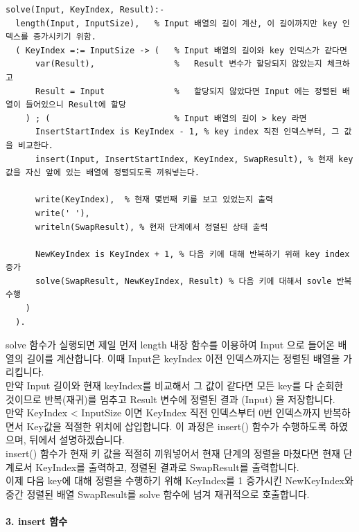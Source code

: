 \documentclass{article}
\begin{document}
\begin{verbatim}
solve(Input, KeyIndex, Result):-
  length(Input, InputSize),   % Input 배열의 길이 계산, 이 길이까지만 key 인덱스를 증가시키기 위함.
  ( KeyIndex =:= InputSize -> (   % Input 배열의 길이와 key 인덱스가 같다면
      var(Result),                %   Result 변수가 할당되지 않았는지 체크하고
      Result = Input              %   할당되지 않았다면 Input 에는 정렬된 배열이 들어있으니 Result에 할당
    ) ; (                         % Input 배열의 길이 > key 라면
      InsertStartIndex is KeyIndex - 1, % key index 직전 인덱스부터, 그 값을 비교한다.
      insert(Input, InsertStartIndex, KeyIndex, SwapResult), % 현재 key값을 자신 앞에 있는 배열에 정렬되도록 끼워넣는다.

      write(KeyIndex),  % 현재 몇번째 키를 보고 있었는지 출력
      write(' '),
      writeln(SwapResult), % 현재 단계에서 정렬된 상태 출력

      NewKeyIndex is KeyIndex + 1, % 다음 키에 대해 반복하기 위해 key index 증가
      solve(SwapResult, NewKeyIndex, Result) % 다음 키에 대해서 sovle 반복 수행
    )
  ).
\end{verbatim}
solve 함수가 실행되면 제일 먼저 length 내장 함수를 이용하여 Input 으로 들어온 배열의 길이를 계산합니다. 이때 Input은 keyIndex 이전 인덱스까지는 정렬된 배열을 가리킵니다.\\
만약 Input 길이와 현재 keyIndex를 비교해서 그 값이 같다면 모든 key를 다 순회한 것이므로 반복(재귀)를 멈추고 Result 변수에 정렬된 결과 (Input) 을 저장합니다.\\
만약 KeyIndex < InputSize 이면 KeyIndex 직전 인덱스부터 0번 인덱스까지 반복하면서 Key값을 적절한 위치에 삽입합니다. 이 과정은 insert() 함수가 수행하도록 하였으며, 뒤에서 설명하겠습니다.\\
insert() 함수가 현재 키 값을 적절히 끼워넣어서 현재 단계의 정렬을 마쳤다면 현재 단계로서 KeyIndex를 출력하고, 정렬된 결과로 SwapResult를 출력합니다.\\
이제 다음 key에 대해 정렬을 수행하기 위해 KeyIndex를 1 증가시킨 NewKeyIndex와 중간 정렬된 배열 SwapResult를 solve 함수에 넘겨 재귀적으로 호출합니다.\\\\
\textbf{3. insert 함수}
\end{document}
